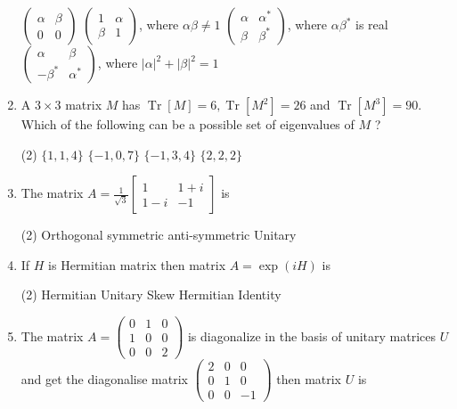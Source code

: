 \begin{enumerate}
\begin{tasks}
		\task[\textbf{a.}] $\left(\begin{array}{ll}\alpha & \beta \\ 0 & 0\end{array}\right)$
		\task[\textbf{b.}] $\left(\begin{array}{lr}1 & \alpha \\ \beta & 1\end{array}\right)$, where $\alpha \beta \neq 1$
		\task[\textbf{c.}] $\left(\begin{array}{cc}\alpha & \alpha^{*} \\ \beta & \beta^{*}\end{array}\right)$, where $\alpha \beta^{*}$ is real
		\task[\textbf{d.}]  $\left(\begin{array}{cc}\alpha & \beta \\ -\beta^{*} & \alpha^{*}\end{array}\right)$, where $|\alpha|^{2}+|\beta|^{2}=1$
	\end{tasks}
	\item A $3 \times 3$ matrix $M$ has $\operatorname{Tr}[M]=6, \operatorname{Tr}\left[M^{2}\right]=26$ and $\operatorname{Tr}\left[M^{3}\right]=90$. Which of the following can be a possible set of eigenvalues of $M$ ?
	 \begin{tasks}(2)
		\task[\textbf{a.}]$\{1,1,4\}$
		\task[\textbf{b.}]$\{-1,0,7\}$
		\task[\textbf{c.}]$\{-1,3,4\}$
		\task[\textbf{d.}] $\{2,2,2\}$
	\end{tasks}
	\item The matrix $A=\frac{1}{\sqrt{3}}\left[\begin{array}{cc}1 & 1+i \\ 1-i & -1\end{array}\right]$ is
	 \begin{tasks}(2)
		\task[\textbf{a.}]Orthogonal
		\task[\textbf{b.}] symmetric
		\task[\textbf{c.}]anti-symmetric
		\task[\textbf{d.}] Unitary
	\end{tasks}
	\item If $H$ is Hermitian matrix then matrix $A=\exp (i H)$ is
	 \begin{tasks}(2)
		\task[\textbf{a.}] Hermitian
		\task[\textbf{b.}]Unitary
		\task[\textbf{c.}]Skew Hermitian
		\task[\textbf{d.}] Identity
	\end{tasks}
	\item The matrix $A=\left(\begin{array}{ccc}0 & 1 & 0 \\ 1 & 0 & 0 \\ 0 & 0 & 2\end{array}\right)$ is diagonalize in the basis of unitary matrices $U$ and get the diagonalise matrix $\left(\begin{array}{ccc}2 & 0 & 0 \\ 0 & 1 & 0 \\ 0 & 0 & -1\end{array}\right)$ then matrix $U$ is

\end{enumerate}
